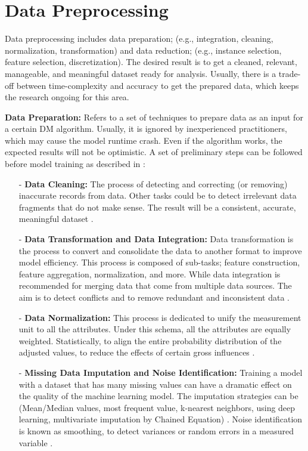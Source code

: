 \section{Data Preprocessing}
\label{sec:2_1_DP}

Data preprocessing \cite{garcia2015} includes data preparation; (e.g., integration, cleaning, normalization, transformation) and data reduction; (e.g., instance selection, feature selection, discretization). The desired result is to get a cleaned, relevant, manageable, and meaningful dataset ready for analysis. Usually, there is a trade-off between time-complexity and accuracy to get the prepared data, which keeps the research ongoing for this area. 
\vspace{7mm}

\noindent \textbf{Data Preparation:}
Refers to a set of techniques to prepare data as an input for a certain DM algorithm. Usually, it is ignored by inexperienced practitioners, which may cause the model runtime crash. Even if the algorithm works, the expected results will not be optimistic. A set of preliminary steps can be followed before model training as described in \cite{garcia2015}: 
\begin{itemize}
    \item[-] \textbf{Data Cleaning:} The process of detecting and correcting (or removing) inaccurate records from data. Other tasks could be to detect irrelevant data fragments that do not make sense. The result will be a consistent, accurate, meaningful dataset \cite{rahm2000d}.
    
    \item[-] \textbf{Data Transformation and Data Integration:} Data transformation is the process to convert and consolidate the data to another format to improve model efficiency. This process is composed of sub-tasks; feature construction, feature aggregation, normalization, and more. While data integration is recommended for merging data that come from multiple data sources. The aim is to detect conflicts and to remove redundant and inconsistent data \cite{lenzerini2002,doan2012}. 
    \item[-] \textbf{Data Normalization:} This process is dedicated to unify the measurement unit to all the attributes. Under this schema, all the attributes are equally weighted. Statistically, to align the entire probability distribution of the adjusted values, to reduce the effects of certain gross influences \cite{pochon2008,pyle1999}.
    
   \item[-] \textbf{Missing Data Imputation and Noise Identification:} Training a model with a dataset that has many missing values can have a dramatic effect on the quality of the machine learning model. The imputation strategies can be (Mean/Median values, most frequent value, k-nearest neighbors, using deep learning, multivariate imputation by Chained Equation) \cite{buuren2010}. Noise identification is known as smoothing, to detect variances or random errors in a measured variable \cite{wang2010}. 
\end{itemize}


